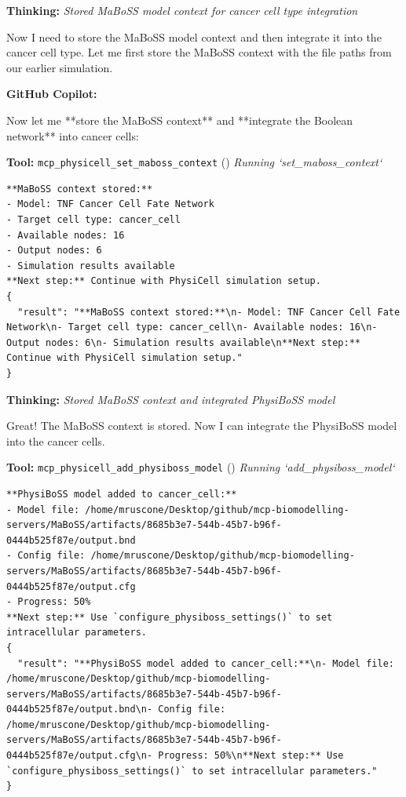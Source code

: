 \documentclass[11pt,a4paper]{article}
\begin{document}
\begin{thinkbox}
\textbf{Thinking:} \textit{Stored MaBoSS model context for cancer cell type integration}

Now I need to store the MaBoSS model context and then integrate it into the cancer cell type. Let me first store the MaBoSS context with the file paths from our earlier simulation.

\end{thinkbox}
\begin{copilotbox}
\textbf{GitHub Copilot:}

Now let me **store the MaBoSS context** and **integrate the Boolean network** into cancer cells:

\end{copilotbox}
\begin{toolokbox}
\textbf{Tool:} \texttt{mcp\_physicell\_set\_maboss\_context} (\checkmark)
\textit{Running `set\_maboss\_context`}
\begin{lstlisting}
**MaBoSS context stored:**
- Model: TNF Cancer Cell Fate Network
- Target cell type: cancer_cell
- Available nodes: 16
- Output nodes: 6
- Simulation results available
**Next step:** Continue with PhysiCell simulation setup.
{
  "result": "**MaBoSS context stored:**\n- Model: TNF Cancer Cell Fate Network\n- Target cell type: cancer_cell\n- Available nodes: 16\n- Output nodes: 6\n- Simulation results available\n**Next step:** Continue with PhysiCell simulation setup."
}
\end{lstlisting}
\end{toolokbox}
\begin{thinkbox}
\textbf{Thinking:} \textit{Stored MaBoSS context and integrated PhysiBoSS model}

Great! The MaBoSS context is stored. Now I can integrate the PhysiBoSS model into the cancer cells.

\end{thinkbox}
\begin{toolokbox}
\textbf{Tool:} \texttt{mcp\_physicell\_add\_physiboss\_model} (\checkmark)
\textit{Running `add\_physiboss\_model`}
\begin{lstlisting}
**PhysiBoSS model added to cancer_cell:**
- Model file: /home/mruscone/Desktop/github/mcp-biomodelling-servers/MaBoSS/artifacts/8685b3e7-544b-45b7-b96f-0444b525f87e/output.bnd
- Config file: /home/mruscone/Desktop/github/mcp-biomodelling-servers/MaBoSS/artifacts/8685b3e7-544b-45b7-b96f-0444b525f87e/output.cfg
- Progress: 50%
**Next step:** Use `configure_physiboss_settings()` to set intracellular parameters.
{
  "result": "**PhysiBoSS model added to cancer_cell:**\n- Model file: /home/mruscone/Desktop/github/mcp-biomodelling-servers/MaBoSS/artifacts/8685b3e7-544b-45b7-b96f-0444b525f87e/output.bnd\n- Config file: /home/mruscone/Desktop/github/mcp-biomodelling-servers/MaBoSS/artifacts/8685b3e7-544b-45b7-b96f-0444b525f87e/output.cfg\n- Progress: 50%\n**Next step:** Use `configure_physiboss_settings()` to set intracellular parameters."
}
\end{lstlisting}
\end{toolokbox}
\end{document}
